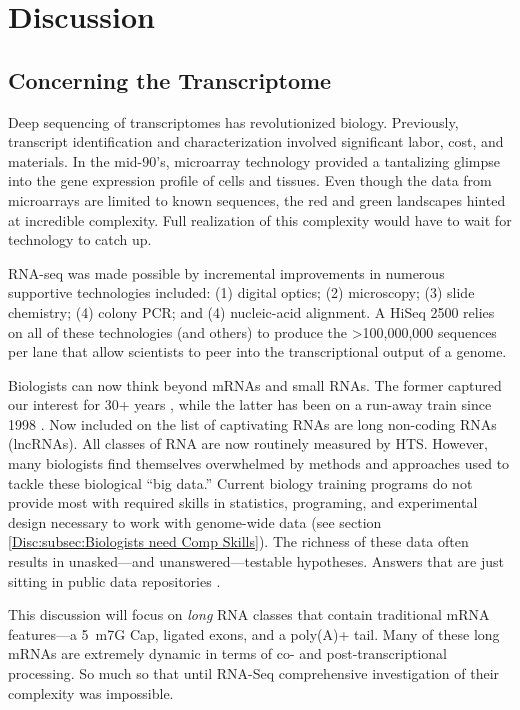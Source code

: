 \chapter{Discussion} 
\label{Disc}
\section{Concerning the Transcriptome}
  \label{Disc:sec:Future of Dynamic long RNAs}

  Deep sequencing of transcriptomes has revolutionized biology. Previously, transcript identification and characterization involved significant labor, cost, and materials. In the mid-90's, microarray technology \citep{Schena1995a} provided a tantalizing glimpse into the gene expression profile of cells and tissues. Even though the data from microarrays are limited to known sequences, the red and green landscapes hinted at incredible complexity. Full realization of this complexity would have to wait for technology to catch up.

  RNA-seq was made possible by incremental improvements in numerous supportive technologies included: (1) digital optics; (2) microscopy; (3) slide chemistry; (4) colony PCR; and (4) nucleic-acid alignment. A HiSeq 2500 relies on all of these technologies (and others) to produce the >100,000,000 sequences per lane that allow scientists to peer into the transcriptional output of a genome.

  Biologists can now think beyond mRNAs and small RNAs. The former captured our interest for 30+ years \citep{Furuichi1975,Wei1975}, while the latter has been on a run-away train since 1998 \citep{Fire1998}. Now included on the list of captivating RNAs are long non-coding RNAs (lncRNAs). All classes of RNA are now routinely measured by HTS. However, many biologists find themselves overwhelmed by methods and approaches used to tackle these biological ``big data.'' Current biology training programs do not provide most with required skills in statistics, programing, and experimental design necessary to work with genome-wide data (see section \ref{Disc:subsec:Biologists need Comp Skills}). The richness of these data often results in unasked---and unanswered---testable hypotheses. Answers that are just sitting in public data repositories \citep{Plocik2013}.

  This discussion will focus on \textit{long} RNA classes that contain traditional mRNA features---a 5\textprime~m7G Cap, ligated exons, and a poly(A)+ tail. Many of these long mRNAs are extremely dynamic in terms of co- and post-transcriptional processing. So much so that until RNA-Seq comprehensive investigation of their complexity was impossible.

